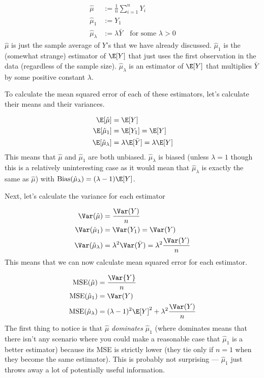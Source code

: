 \documentclass[
  letterpaper,
  DIV=11,
  numbers=noendperiod]{scrreprt}
\begin{document}
\[
  \begin{aligned}
    \hat{\mu} &:= \frac{1}{n} \sum_{i=1}^n Y_i \\
    \hat{\mu}_1 &:= Y_1 \\
    \hat{\mu}_\lambda &:= \lambda \bar{Y} \quad \textrm{for some } \lambda > 0 
  \end{aligned}
\] \(\hat{\mu}\) is just the sample average of \(Y\)'s that we have
already discussed. \(\hat{\mu}_1\) is the (somewhat strange) estimator
of \(\E[Y]\) that just uses the first observation in the data
(regardless of the sample size). \(\hat{\mu}_\lambda\) is an estimator
of \(\E[Y]\) that multiplies \(\bar{Y}\) by some positive constant
\(\lambda\).

To calculate the mean squared error of each of these estimators, let's
calculate their means and their variances.

\[
  \begin{aligned}
    \E[\hat{\mu}] &= \E[Y] \\
    \E[\hat{\mu}_1] &= \E[Y_1] = \E[Y] \\
    \E[\hat{\mu}_\lambda] &= \lambda \E[\bar{Y}] = \lambda \E[Y]
  \end{aligned}
\] This means that \(\hat{\mu}\) and \(\hat{\mu}_1\) are both unbiased.
\(\hat{\mu}_\lambda\) is biased (unless \(\lambda=1\) though this is a
relatively uninteresting case as it would mean that
\(\hat{\mu}_\lambda\) is exactly the same as \(\hat{\mu}\)) with
\(\textrm{Bias}(\hat{\mu}_\lambda) = (\lambda - 1) \E[Y]\).

Next, let's calculate the variance for each estimator

\[
  \begin{aligned}
  \Var(\hat{\mu}) &= \frac{\Var(Y)}{n} \\
  \Var(\hat{\mu}_1) &= \Var(Y_1) = \Var(Y) \\
  \Var(\hat{\mu}_\lambda) &= \lambda^2 \Var(\bar{Y}) = \lambda^2 \frac{\Var(Y)}{n}
  \end{aligned}
\] This means that we can now calculate mean squared error for each
estimator.

\[
  \begin{aligned}
    \textrm{MSE}(\hat{\mu}) &= \frac{\Var{Y}}{n} \\
    \textrm{MSE}(\hat{\mu}_1) &= \Var(Y) \\
    \textrm{MSE}(\hat{\mu}_\lambda) &= (\lambda-1)^2\E[Y]^2 + \lambda^2 \frac{\Var(Y)}{n}
  \end{aligned}
\] The first thing to notice is that \(\hat{\mu}\) \emph{dominates}
\(\hat{\mu}_1\) (where dominates means that there isn't any scenario
where you could make a reasonable case that \(\hat{\mu}_1\) is a better
estimator) because its MSE is strictly lower (they tie only if \(n=1\)
when they become the same estimator). This is probably not surprising
--- \(\hat{\mu}_1\) just throws away a lot of potentially useful
information.
\end{document}
